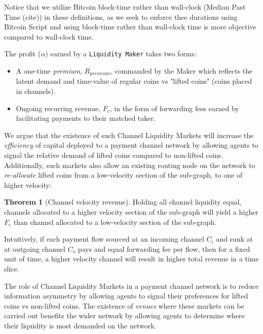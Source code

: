 \documentclass[12pt,a4paper]{article}
\theoremstyle{definition}
\newtheorem{theorem}{Theorem}[section]
\begin{document}
Notice that we utilize Bitcoin block-time rather than wall-clock (Median Past
Time (cite)) in these definitions, as we seek to enforce thee durations using
Bitcoin Script and using block-time rather than wall-clock time is more
objective compared to wall-clock time.

The profit ($\alpha$) earned by a \texttt{Liquidity Maker} takes two forms:
\begin{itemize}
   \item A one-time \emph{premium}, $R_{premium}$, commanded by the Maker which
       reflects the latent demand and time-value of regular coins vs "lifted
       coins" (coins placed in channels).

   \item Ongoing recurring revenue, $F_c$,  in the form of forwarding fees
       earned by facilitating payments to their matched taker.
\end{itemize}


We argue that the existence of such Channel Liquidity Markets will increase the
\emph{efficiency} of capital deployed to a payment channel network by allowing
agents to signal the relative demand of lifted coins compared to non-lifted
coins. Additionally, such markets also allow an existing routing node on the
network to \emph{re-allocate} lifted coins from a low-velocity section of the
sub-graph, to one of higher velocity:

\begin{theorem}[Channel velocity revenue] %
Holding all channel liquidity equal, channels allocated to a higher velocity
section of the sub-graph will yield a higher $F_c$  than channel allocated to a
low-velocity section of the sub-graph.
\end{theorem}

Intuitively, if each payment flow sourced at an incoming channel $C_i$ and sunk
at at outgoing channel $C_o$ pays and equal forwarding fee per flow, then for a
fixed unit of time, a higher velocity channel will result in higher total
revenue in a time slice.

The role of Channel Liquidity Markets in a payment channel network is to reduce
information asymmetry by allowing agents to signal their preferences for lifted
coins vs non-lifted coins. The existence of \emph{venues} where these markets
can be carried out benefits the wider network by allowing agents to determine
where their liquidity is most demanded on the network. %
\end{document}
